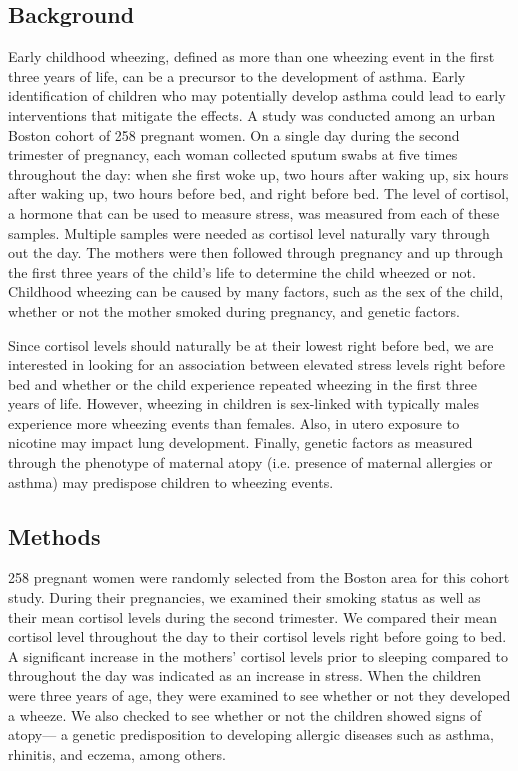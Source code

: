 \documentclass{article}
\begin{document}
\begin{enumerate}
	

	\newpage
	\subsection*{Background}
	
	Early childhood wheezing, defined as more than one wheezing event in the first three years of life, can be a precursor to the development of asthma. Early identification of children who may potentially develop asthma could lead to early interventions that mitigate the effects. A study was conducted among an urban Boston cohort of 258 pregnant women. On a single day during the second trimester of pregnancy, each woman collected sputum swabs at five times throughout the day: when she first woke up, two hours after waking up, six hours after waking up, two hours before bed, and right before bed. The level of cortisol, a hormone that can be used to measure stress, was measured from each of these samples. Multiple samples were needed as cortisol level naturally vary through out the day. The mothers were then followed through pregnancy and up through the first three years of the child's life to determine the child wheezed or not. Childhood wheezing can be caused by many factors, such as the sex of the child, whether or not the mother smoked during pregnancy, and genetic factors.
	
	Since cortisol levels should naturally be at their lowest right before bed, we are interested in looking for an association between elevated stress levels right before bed and whether or the child experience repeated wheezing in the first three years of life. However, wheezing in children is sex-linked with typically males experience more wheezing events than females. Also, in utero exposure to nicotine may impact lung development. Finally, genetic factors as measured through the phenotype of maternal atopy (i.e. presence of maternal allergies or asthma) may predispose children to wheezing events.

	\subsection*{Methods}
	258 pregnant women were randomly selected from the Boston area for this cohort study. During their pregnancies, we examined their smoking status as well as their mean cortisol levels during the second trimester. We compared their mean cortisol level throughout the day to their cortisol levels right before going to bed. A significant increase in the mothers’ cortisol levels prior to sleeping compared to throughout the day was indicated as an increase in stress. When the children were three years of age, they were examined to see whether or not they developed a wheeze. We also checked to see whether or not the children showed signs of atopy— a genetic predisposition to developing allergic diseases such as asthma, rhinitis, and eczema, among others.


\end{enumerate}
\end{document}

